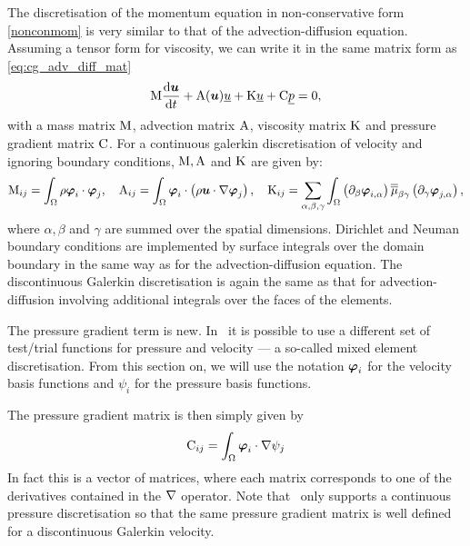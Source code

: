 \label{Sect:ND_momentum_equation}
The discretisation of the momentum equation in non-conservative
form \eqref{nonconmom} is very similar to that of the advection-diffusion 
equation. Assuming a tensor form for viscosity, we
can write it in the same matrix form as
\eqref{eq:cg_adv_diff_mat}
\begin{equation}\label{eq:momentum_equation}
  \mathrm{M} \frac{\mathrm{d}{\mbox{\boldmath$u$}}}{\mathrm{d} t}
    +\mathrm{A}({\mbox{\boldmath$u$}})\underline{u}+\mathrm{K}\underline{ u}
    +\mathrm{C} \underline{p}
    =0,
\end{equation}
with a mass matrix $\mathrm{M}$, advection matrix $\mathrm{A}$,
viscosity matrix $\mathrm{K}$ and pressure gradient matrix $\mathrm{C}$.
For a continuous galerkin discretisation of
velocity and ignoring boundary conditions, $\mathrm{M}, \mathrm{A}$ and $\mathrm{K}$
are given by:
\begin{equation}
  \mathrm{M}_{ij}=\int_\Omega \rho{\mbox{\boldmath$\varphi$}}_i\cdot{\mbox{\boldmath$\varphi$}}_j, \quad
  \mathrm{A}_{ij}=\int_\Omega {\mbox{\boldmath$\varphi$}}_i\cdot\left(\rho{\mbox{\boldmath$u$}}\cdot\nabla {\mbox{\boldmath$\varphi$}}_j\right), \quad
  \mathrm{K}_{ij}=\sum_{\alpha,\beta,\gamma} \int_\Omega
    \left(\partial_\beta{\mbox{\boldmath$\varphi$}}_{i,\alpha}\right) \overline{\overline{\mu}}_{\beta\gamma}
      \left(\partial_\gamma {\mbox{\boldmath$\varphi$}}_{j,\alpha}\right),
\end{equation}
where $\alpha,\beta$ and $\gamma$ are summed over the spatial dimensions.
Dirichlet and Neuman boundary conditions are implemented by
surface integrals over the domain boundary in the same way
as for the advection-diffusion equation. The discontinuous Galerkin
discretisation is again the same as that for advection-diffusion
involving additional integrals over the faces of the elements.

The pressure gradient term is new. In \fluidity\ it is possible
to use a different set of test/trial functions for pressure
and velocity --- a so-called mixed element discretisation. From this section
on, we will use the notation ${\mbox{\boldmath$\varphi$}}_i$ for the velocity
basis functions and $\psi_i$ for the pressure basis functions.

The pressure gradient matrix is then simply given by
\begin{equation}
  \mathrm{C}_{ij}=\int_\Omega {\mbox{\boldmath$\varphi$}}_i\cdot\nabla\psi_j \label{pgmatrix}
\end{equation}
In fact this is a vector of matrices, where each matrix corresponds
to one of the derivatives contained in the $\nabla$ operator. Note that \fluidity\ only supports
a continuous pressure discretisation so that the same
pressure gradient matrix is well defined for a discontinuous Galerkin
velocity.

